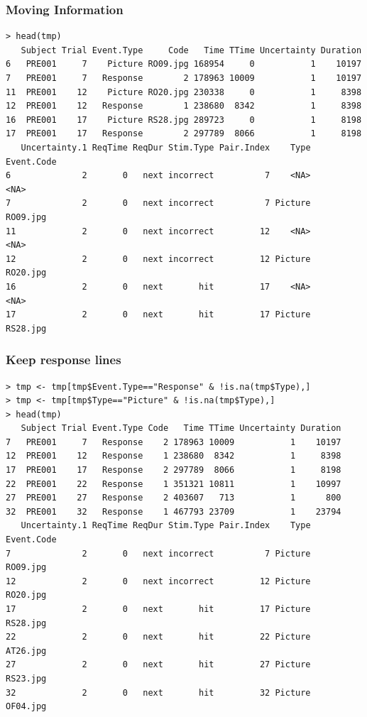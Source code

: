 \documentclass[xcolor={table},c]{beamer}
\begin{document}
\begin{frame}[fragile]\frametitle{Moving Information}\scriptsize
\begin{verbatim}
> head(tmp)
   Subject Trial Event.Type     Code   Time TTime Uncertainty Duration
6   PRE001     7    Picture RO09.jpg 168954     0           1    10197
7   PRE001     7   Response        2 178963 10009           1    10197
11  PRE001    12    Picture RO20.jpg 230338     0           1     8398
12  PRE001    12   Response        1 238680  8342           1     8398
16  PRE001    17    Picture RS28.jpg 289723     0           1     8198
17  PRE001    17   Response        2 297789  8066           1     8198
   Uncertainty.1 ReqTime ReqDur Stim.Type Pair.Index    Type Event.Code
6              2       0   next incorrect          7    <NA>       <NA>
7              2       0   next incorrect          7 Picture   RO09.jpg
11             2       0   next incorrect         12    <NA>       <NA>
12             2       0   next incorrect         12 Picture   RO20.jpg
16             2       0   next       hit         17    <NA>       <NA>
17             2       0   next       hit         17 Picture   RS28.jpg
\end{verbatim}
\end{frame}


\begin{frame}[fragile]\frametitle{Keep response lines}\scriptsize
\begin{verbatim}
> tmp <- tmp[tmp$Event.Type=="Response" & !is.na(tmp$Type),]
> tmp <- tmp[tmp$Type=="Picture" & !is.na(tmp$Type),]
> head(tmp)
   Subject Trial Event.Type Code   Time TTime Uncertainty Duration
7   PRE001     7   Response    2 178963 10009           1    10197
12  PRE001    12   Response    1 238680  8342           1     8398
17  PRE001    17   Response    2 297789  8066           1     8198
22  PRE001    22   Response    1 351321 10811           1    10997
27  PRE001    27   Response    2 403607   713           1      800
32  PRE001    32   Response    1 467793 23709           1    23794
   Uncertainty.1 ReqTime ReqDur Stim.Type Pair.Index    Type Event.Code
7              2       0   next incorrect          7 Picture   RO09.jpg
12             2       0   next incorrect         12 Picture   RO20.jpg
17             2       0   next       hit         17 Picture   RS28.jpg
22             2       0   next       hit         22 Picture   AT26.jpg
27             2       0   next       hit         27 Picture   RS23.jpg
32             2       0   next       hit         32 Picture   OF04.jpg
\end{verbatim}
\end{frame}
\end{document}
